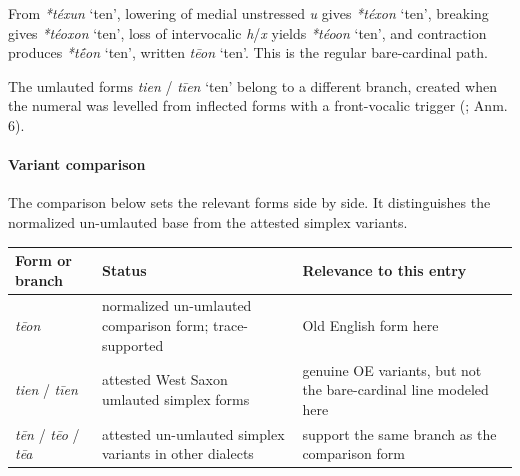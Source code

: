 \documentclass[
  british,
  a4paper,
]{article}
\newcounter{none} %
\providecommand{\Recon}[1]{\emph{*#1}}
\begin{document}
From \Recon{téxun} `ten', lowering of medial unstressed \emph{u} gives
\Recon{téxon} `ten', breaking gives \Recon{téoxon} `ten', loss of
intervocalic \emph{h}/\emph{x} yields \Recon{téoon} `ten', and
contraction produces \Recon{tḗon} `ten', written \emph{tēon} `ten'. This
is the regular bare-cardinal path.

The umlauted forms \emph{tien} / \emph{tīen} `ten' belong to a different
branch, created when the numeral was levelled from inflected forms with
a front-vocalic trigger (;
 Anm. 6).

\paragraph{Variant comparison}\label{variant-comparison-1}

The comparison below sets the relevant forms side by side. It
distinguishes the normalized un-umlauted base from the attested simplex
variants.

{\def\LTcaptype{none} %
\begin{longtable}[]{@{}
  >{\raggedright\arraybackslash}p{}
  >{\raggedright\arraybackslash}p{}
  >{\raggedright\arraybackslash}p{}@{}}
\toprule\noalign{}
\begin{minipage}[b]{\linewidth}\raggedright
Form or branch
\end{minipage} & \begin{minipage}[b]{\linewidth}\raggedright
Status
\end{minipage} & \begin{minipage}[b]{\linewidth}\raggedright
Relevance to this entry
\end{minipage} \\
\midrule\noalign{}
\endhead
\bottomrule\noalign{}
\endlastfoot
\emph{tēon} & normalized un-umlauted comparison form; trace-supported &
Old English form here \\
\emph{tien} / \emph{tīen} & attested West Saxon umlauted simplex forms &
genuine OE variants, but not the bare-cardinal line modeled here \\
\emph{tēn} / \emph{tēo} / \emph{tēa} & attested un-umlauted simplex
variants in other dialects & support the same branch as the comparison
form \\
\end{longtable}
}
\end{document}
